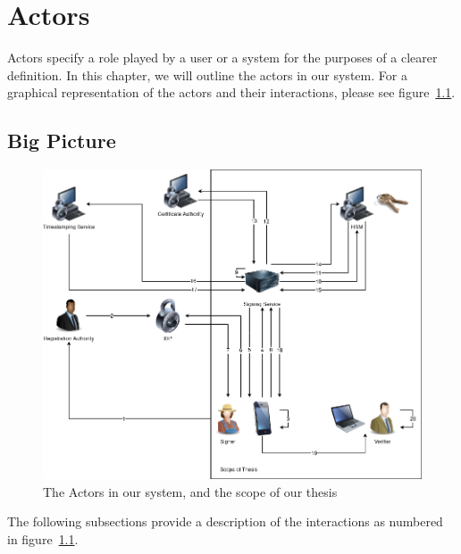 \chapter{Actors}
\label{ch:actors}

Actors specify a role played by a user or a system for the purposes of a clearer definition.
In this chapter, we will outline the actors in our system.
For a graphical representation of the actors and their interactions, please see figure~\ref{fig:bigpicture}.

\section{Big Picture}\label{sec:big-picture}

\begin{figure}[H]
	\begin{center}
		\includegraphics[scale=0.55]{images/BigPicture.png}
		\caption{The Actors in our system, and the scope of our thesis}
		\label{fig:bigpicture}
	\end{center}
\end{figure}

The following subsections provide a description of the interactions as numbered in figure~\ref{fig:bigpicture}.

